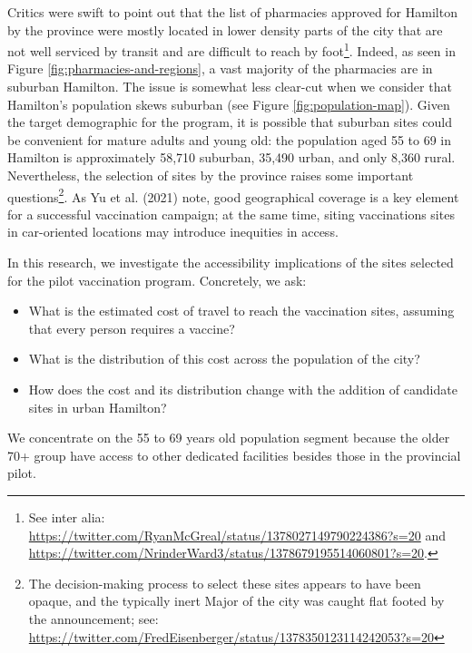 \documentclass[]{elsarticle} %
\providecommand{\tightlist}{%
  \setlength{\itemsep}{0pt}\setlength{\parskip}{0pt}}
\begin{document}
Critics were swift to point out that the list of pharmacies approved for
Hamilton by the province were mostly located in lower density parts of
the city that are not well serviced by transit and are difficult to
reach by
foot\footnote{See inter alia: \url{https://twitter.com/RyanMcGreal/status/1378027149790224386?s=20} and \url{https://twitter.com/NrinderWard3/status/1378679195514060801?s=20}.}.
Indeed, as seen in Figure \ref{fig:pharmacies-and-regions}, a vast
majority of the pharmacies are in suburban Hamilton. The issue is
somewhat less clear-cut when we consider that Hamilton's population
skews suburban (see Figure \ref{fig:population-map}). Given the target
demographic for the program, it is possible that suburban sites could be
convenient for mature adults and young old: the population aged 55 to 69
in Hamilton is approximately 58,710 suburban, 35,490 urban, and only
8,360 rural. Nevertheless, the selection of sites by the province raises
some important
questions\footnote{The decision-making process to select these sites appears to have been opaque, and the typically inert Major of the city was caught flat footed by the announcement; see: \url{https://twitter.com/FredEisenberger/status/1378350123114242053?s=20}}.
As Yu et al. (2021) note, good geographical coverage is a key element
for a successful vaccination campaign; at the same time, siting
vaccinations sites in car-oriented locations may introduce inequities in
access.

In this research, we investigate the accessibility implications of the
sites selected for the pilot vaccination program. Concretely, we ask:

\begin{itemize}
\tightlist
\item
  What is the estimated cost of travel to reach the vaccination sites,
  assuming that every person requires a vaccine?
\item
  What is the distribution of this cost across the population of the
  city?
\item
  How does the cost and its distribution change with the addition of
  candidate sites in urban Hamilton?
\end{itemize}

We concentrate on the 55 to 69 years old population segment because the
older 70+ group have access to other dedicated facilities besides those
in the provincial pilot.
\end{document}
